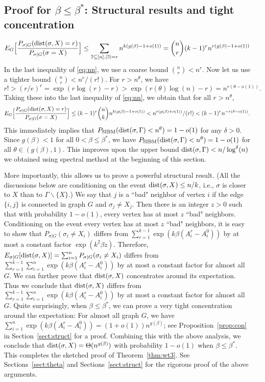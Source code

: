 \documentclass{article}
\begin{document}
\subsection{Proof for $\beta\le\beta^\ast$: Structural results and tight concentration}
\begin{equation} \label{eq:nn}
E_G \Big[ \frac{P_{\sigma|G} ( \operatorname{dist}(\sigma, X) = r)}{P_{\sigma|G}(\sigma= X)} \Big]
\le \sum_{\mathcal{I}\subseteq[n],|\mathcal{I}|=r} 
n^{k (g(\beta)-1+o(1))}
= \binom{n}{r} (k-1)^r n^{r (g(\beta)-1+o(1))}
\end{equation}
In the last inequality of \eqref{eq:nn}, we use a coarse bound $\binom{n}{r}<n^r$. Now let us use a tighter bound $\binom{n}{r}<n^r/(r!)$. 
For $r>n^{\theta}$, we have
$
r!>(r/e)^r
=\exp(r\log(r)-r)
>\exp(r(\theta)\log(n)-r)
=n^{r(\theta-o(1))} .
$
Taking these into the last inequality of \eqref{eq:nn}, we obtain that for all $r>n^{\theta}$,
$$
E_G \Big[ \frac{P_{\sigma|G} ( \operatorname{dist}(\sigma, X) = r )}{P_{\sigma|G}(\sigma= X)} \Big]
\le  (k-1)^r\binom{n}{k} n^{k (g(\beta)-1+o(1))}
< n^{r (g(\beta)+o(1))} /(r!) 
< (k-1)^rn^{-r(\delta-o(1))} .
$$
This immediately implies that  $P_{\operatorname{SIBM}} (\operatorname{dist}(\sigma, \Gamma)<n^{\theta} ) = 1- o(1)$ for any $\delta>0$. Since $g(\beta)<1$ for all $0<\beta\le\beta^\ast$, we have $P_{\operatorname{SIBM}} (\operatorname{dist}(\sigma, \Gamma)<n^{\theta} ) = 1- o(1)$ for all $\theta\in (g(\beta), 1)$. This improves upon the upper bound 
$\operatorname{dist}(\sigma, \Gamma)< n/\log^{\delta}(n)$ we obtained using spectral method at the beginning of this section.

More importantly, this allows us to prove a powerful structural result. (All the discussions below are conditioning on the event $\operatorname{dist}(\sigma,X)\le n/k$, i.e., $\sigma$ is closer to $X$ than to $\Gamma\backslash\{X\}$.) We say that $j$ is a ``bad" neighbor of vertex $i$ if the edge $\{i,j\}$ is connected in graph $G$ and $\sigma_j\neq X_j$. Then there is an integer $z>0$ such that with probability $1-o(1)$, every vertex has at most $z$ ``bad" neighbors.
Conditioning on the event every vertex has at most $z$ ``bad" neighbors, it is easy to show that $P_{\sigma|G}(\sigma_i \neq X_i)$ differs from $\sum_{r=1}^{k-1}\exp (k \beta (A^r_i-A^0_i))$ by at most a constant factor $\exp(k^2\beta z)$.
Therefore, $E_{\sigma|G}[\operatorname{dist}(\sigma,X)]=\sum_{i=1}^n P_{\sigma|G}(\sigma_i \neq X_i)$ differs from $\sum_{r=1}^{k-1} \sum_{i=1}^n\exp (k \beta (A^r_i-A^0_i))$ by at most a constant factor for almost all $G$.
We can further prove that $\operatorname{dist}(\sigma,X)$ concentrates around its expectation. Thus we conclude that $\operatorname{dist}(\sigma,X)$ differs from $\sum_{r=1}^{k-1} \sum_{i=1}^n\exp (k \beta (A^r_i-A^0_i))$ by at most a constant factor for almost all $G$.
Quite surprisingly, when $\beta\le\beta^\ast$, we can prove a very tight concentration around the expectation: For almost all graph $G$, we have $\sum_{i=1}^n\exp (k \beta (A^r_i-A^0_i))=(1+o(1))n^{g(\beta)}$; see Proposition~\ref{prop:con} in Section~\ref{sect:struct} for a proof. Combining this with the above analysis, we conclude that $\operatorname{dist}(\sigma,X)=\Theta(n^{g(\beta)})$ with probability $1-o(1)$ when $\beta\le\beta^\ast$. This completes the sketched proof of Theorem~\ref{thm:wt3}.
See Sections~\ref{sect:theta} and Sections~\ref{sect:struct} for the rigorous proof of the above arguments.
\end{document}
